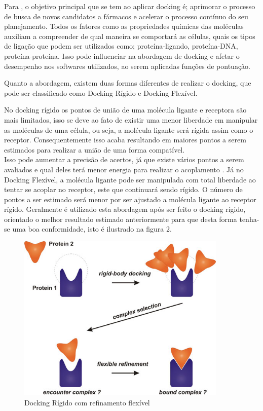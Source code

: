 \documentclass[tcc, capa]{texucpel}
\begin{document}
Para \cite{rodrigues2012estrategias}, o objetivo principal que se tem ao aplicar docking é; aprimorar o processo de busca de novos candidatos a fármacos e acelerar o processo contínuo do seu planejamento. 
Todos os fatores como as propriedades químicas das moléculas auxiliam a compreender de qual maneira se comportará as células, quais os tipos de ligação que podem ser utilizados como; proteína-ligando, proteína-DNA, proteína-proteína. Isso pode influenciar na abordagem de docking e afetar o desempenho nos softwares utilizados, ao serem aplicadas funções de pontuação.

Quanto a abordagem, existem duas formas diferentes de realizar o docking, que pode ser classificado como Docking Rígido e Docking Flexível.

No docking rígido os pontos de união de uma molécula ligante e receptora são mais limitados, isso se deve ao fato de existir uma menor liberdade em manipular as moléculas de uma célula, ou seja, a molécula ligante será rígida assim como o receptor. Consequentemente isso acaba resultando em maiores pontos a serem estimados para realizar a união de uma forma compatível. \\
Isso pode aumentar a precisão de acertos, já que existe vários pontos a serem avaliados e qual deles terá menor energia para realizar o acoplamento \cite{pagadala2017software}. 
Já no Docking Flexível, a molécula ligante pode ser manipulada com total liberdade ao tentar se acoplar no receptor,  este que continuará sendo rígido. O número de pontos a ser estimado será menor por ser ajustado a molécula ligante ao receptor rígido.
Geralmente é utilizado esta abordagem após ser feito o docking rígido, orientado o melhor resultado estimado anteriormente para que desta forma tenha-se uma boa conformidade, isto é ilustrado na figura 2.


      \begin{figure}[!htb]
	\centering\includegraphics[width=10cm]{imagens/rigid_flexible.jpg}
	\caption{Docking Rígido com refinamento flexível}
	\end{figure}
\end{document}
